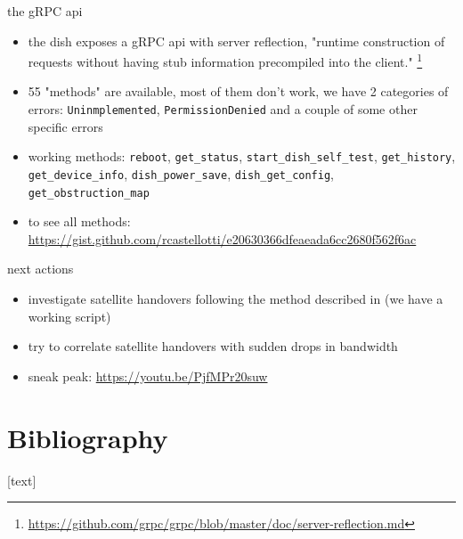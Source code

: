 \documentclass[NET,english,beameralt]{tumbeamer}
\begin{document}
\begin{frame}{the gRPC api}
\begin{itemize}
    \item the dish exposes a gRPC api with server reflection, "runtime construction of requests without having stub information precompiled into the client." \footnote{\href{https://github.com/grpc/grpc/blob/master/doc/server-reflection.md}{https://github.com/grpc/grpc/blob/master/doc/server-reflection.md}}
    \item 55 "methods" are available, most of them don't work, we have 2 categories of errors: \texttt{Uninmplemented}, \texttt{PermissionDenied} and a couple of some other specific errors 
    \item working methods: \texttt{reboot}, \texttt{get\_status}, \texttt{start\_dish\_self\_test}, \texttt{get\_history}, \texttt{get\_device\_info}, \texttt{dish\_power\_save}, \texttt{dish\_get\_config}, \texttt{get\_obstruction\_map}
    \item to see all methods: \href{https://gist.github.com/rcastellotti/e20630366dfeaeada6cc2680f562f6ac}{https://gist.github.com/rcastellotti/e20630366dfeaeada6cc2680f562f6ac}
\end{itemize}
\end{frame}

\begin{frame}{next actions}
\begin{itemize}
    \item investigate satellite handovers following the method described in \cite{izhikevich2023democratizing} (we have a working script)
    \item try to correlate satellite handovers with sudden drops in bandwidth
    \item sneak peak: \href{https://youtu.be/PjfMPr20suw}{https://youtu.be/PjfMPr20suw}
\end{itemize}
\end{frame}

\section{Bibliography}
\begin{frame}[allowframebreaks]
    
    [text]
    \footnotesize
    
\end{frame}
\end{document}

